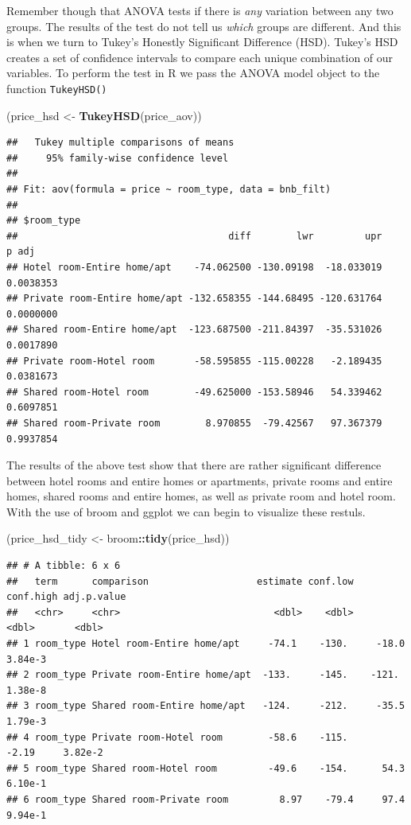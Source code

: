 \documentclass[
]{book}
\newenvironment{Shaded}{\begin{snugshade}}{\end{snugshade}}
\newcommand{\KeywordTok}[1]{\textcolor[rgb]{0.13,0.29,0.53}{\textbf{#1}}}
\newcommand{\NormalTok}[1]{#1}
\newcommand{\OperatorTok}[1]{\textcolor[rgb]{0.81,0.36,0.00}{\textbf{#1}}}
\newcommand{\StringTok}[1]{\textcolor[rgb]{0.31,0.60,0.02}{#1}}
\begin{document}
Remember though that ANOVA tests if there is \emph{any} variation between any two groups. The results of the test do not tell us \emph{which} groups are different. And this is when we turn to Tukey's Honestly Significant Difference (HSD). Tukey's HSD creates a set of confidence intervals to compare each unique combination of our variables. To perform the test in R we pass the ANOVA model object to the function \texttt{TukeyHSD()}

\begin{Shaded}
\begin{Highlighting}[]
\NormalTok{(price\_hsd \textless{}{-}}\StringTok{ }\KeywordTok{TukeyHSD}\NormalTok{(price\_aov))}
\end{Highlighting}
\end{Shaded}

\begin{verbatim}
##   Tukey multiple comparisons of means
##     95% family-wise confidence level
## 
## Fit: aov(formula = price ~ room_type, data = bnb_filt)
## 
## $room_type
##                                     diff        lwr         upr     p adj
## Hotel room-Entire home/apt    -74.062500 -130.09198  -18.033019 0.0038353
## Private room-Entire home/apt -132.658355 -144.68495 -120.631764 0.0000000
## Shared room-Entire home/apt  -123.687500 -211.84397  -35.531026 0.0017890
## Private room-Hotel room       -58.595855 -115.00228   -2.189435 0.0381673
## Shared room-Hotel room        -49.625000 -153.58946   54.339462 0.6097851
## Shared room-Private room        8.970855  -79.42567   97.367379 0.9937854
\end{verbatim}

The results of the above test show that there are rather significant difference between hotel rooms and entire homes or apartments, private rooms and entire homes, shared rooms and entire homes, as well as private room and hotel room. With the use of broom and ggplot we can begin to visualize these restuls.

\begin{Shaded}
\begin{Highlighting}[]
\NormalTok{(price\_hsd\_tidy \textless{}{-}}\StringTok{ }\NormalTok{broom}\OperatorTok{::}\KeywordTok{tidy}\NormalTok{(price\_hsd))}
\end{Highlighting}
\end{Shaded}

\begin{verbatim}
## # A tibble: 6 x 6
##   term      comparison                   estimate conf.low conf.high adj.p.value
##   <chr>     <chr>                           <dbl>    <dbl>     <dbl>       <dbl>
## 1 room_type Hotel room-Entire home/apt     -74.1    -130.     -18.0      3.84e-3
## 2 room_type Private room-Entire home/apt  -133.     -145.    -121.       1.38e-8
## 3 room_type Shared room-Entire home/apt   -124.     -212.     -35.5      1.79e-3
## 4 room_type Private room-Hotel room        -58.6    -115.      -2.19     3.82e-2
## 5 room_type Shared room-Hotel room         -49.6    -154.      54.3      6.10e-1
## 6 room_type Shared room-Private room         8.97    -79.4     97.4      9.94e-1
\end{verbatim}
\end{document}
